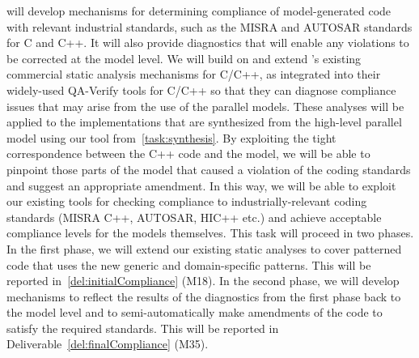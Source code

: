 \begin{Workpackage}{\thewpno}
\begin{Task}
\TaskResults{
\ref{del:initialCompliance}
\ref{del:finalCompliance}
}
\TaskHeader{}
\theTask{} will develop mechanisms for determining compliance of model-generated
code with relevant industrial standards, such as the MISRA and AUTOSAR standards for C and C++.
It will also provide diagnostics that will enable any violations to be corrected at the
model level. We will build on and extend \PRLshort{}'s existing commercial static analysis mechanisms for C/C++,
as integrated into their widely-used QA-Verify tools for C/C++ so that they can diagnose compliance issues that may arise
from the use of the parallel models.  These analyses will be applied to the
implementations that are synthesized from the high-level parallel model using our tool from~\ref{task:synthesis}.
By exploiting the tight correspondence between the C++ code and the model,
we will be able to pinpoint those parts of the model that caused a violation of the coding
standards and suggest an appropriate amendment.
In this way, we will be able to exploit our existing tools for checking compliance to
industrially-relevant coding standards (MISRA C++, AUTOSAR, HIC++ etc.) and achieve
acceptable compliance levels for the models themselves. This task will proceed
in two phases. In the first phase, we will extend our existing
static analyses to cover patterned code that uses the new \TheProject{} generic and domain-specific patterns. This will be reported
in~\ref{del:initialCompliance} (M18). In the second phase, we will develop
mechanisms to reflect the results of the diagnostics from the first phase
back to the model level and to semi-automatically make amendments of the
code to satisfy the required standards. This will be reported
in Deliverable~\ref{del:finalCompliance} (M35).
\end{Task}


\end{Workpackage}
